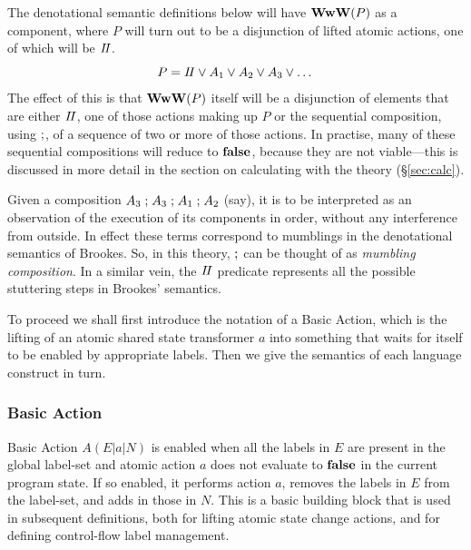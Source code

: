 The denotational semantic definitions below will have
$\mathbf{WwW}(P)$ as a component,
where $P$ will turn out to be a disjunction of lifted atomic actions,
one of which will be $I\!I$.
\[
  P = I\!I \lor A_1 \lor A_2 \lor A_3 \lor \dots
\]
The effect of this is that $\mathbf{WwW}(P)$ itself
will be a disjunction of elements that are
either $I\!I$, one of those actions making up $P$
or the sequential composition, using $\mathrel{;}$,
of a sequence of two or more of those actions.
In practise, many of these sequential compositions will reduce to $\mathbf{false}$,
because they are not viable---this is discussed in more detail in the section
on calculating with the theory (\S\ref{sec:calc}).

Given a composition $A_3\mathrel{;} A_3\mathrel{;} A_1 \mathrel{;} A_2$ (say),
it is to be interpreted as an observation
of the execution of its components in order,
without any interference from outside.
In effect these terms correspond to mumblings in the denotational
semantics of Brookes\cite{DBLP:journals/iandc/Brookes96}.
So, in this theory, $\mathrel{;}$ can be thought of as \emph{mumbling composition}.
In a similar vein, the $I\!I$ predicate represents
all the possible stuttering steps in Brookes' semantics.


To proceed we shall first introduce the notation of a Basic Action,
which is the lifting of an atomic shared state transformer $a$
into something that waits for itself to be enabled by appropriate labels.
Then we give the semantics of each language construct in turn.


\subsubsection{Basic Action}\label{sssec:basic-action}

Basic Action $A(E|a|N)$ is enabled when all the labels in $E$ are present in
the global label-set and atomic action $a$ does not evaluate to $\mathbf{false}$ in
the current program state. If so enabled,  it performs action $a$, removes
the labels in $E$ from the label-set, and adds in those in $N$.
 This is a basic building block that is used in subsequent definitions, both
for lifting atomic state change actions, and for defining control-flow label
management.

